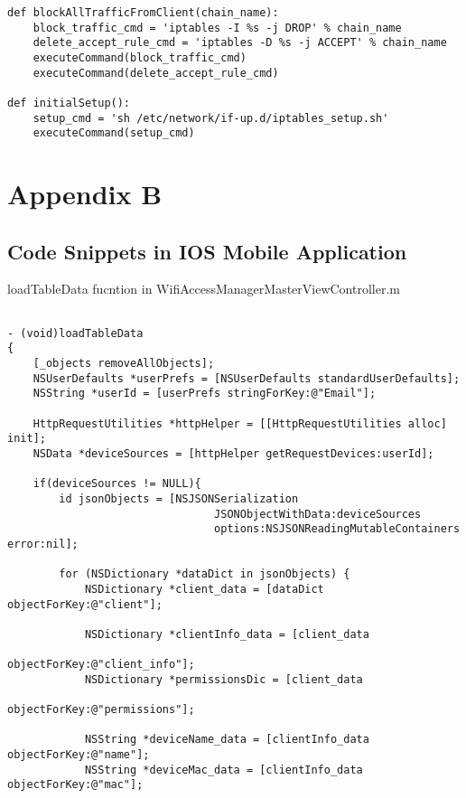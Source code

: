 \begin{appendices}
\begin{algorithm}[h]
\begin{verbatim}
def blockAllTrafficFromClient(chain_name):
    block_traffic_cmd = 'iptables -I %s -j DROP' % chain_name
    delete_accept_rule_cmd = 'iptables -D %s -j ACCEPT' % chain_name
    executeCommand(block_traffic_cmd)
    executeCommand(delete_accept_rule_cmd)

def initialSetup():
    setup_cmd = 'sh /etc/network/if-up.d/iptables_setup.sh'
    executeCommand(setup_cmd)

 \end{verbatim}
\end{algorithm}

\chapter{Appendix B}
\label{chp:appendix2}

\section{Code Snippets in IOS Mobile Application}

\begin{algorithm}[h]
  \caption{loadTableData fucntion in WifiAccessManagerMasterViewController.m}
  \label{code:ios_loadtabledata}
  \begin{verbatim}
  
- (void)loadTableData
{  
    [_objects removeAllObjects];
    NSUserDefaults *userPrefs = [NSUserDefaults standardUserDefaults];
    NSString *userId = [userPrefs stringForKey:@"Email"];
    
    HttpRequestUtilities *httpHelper = [[HttpRequestUtilities alloc] init];
    NSData *deviceSources = [httpHelper getRequestDevices:userId];
    
    if(deviceSources != NULL){
        id jsonObjects = [NSJSONSerialization 
        						JSONObjectWithData:deviceSources 
        						options:NSJSONReadingMutableContainers error:nil];
        
        for (NSDictionary *dataDict in jsonObjects) {
            NSDictionary *client_data = [dataDict objectForKey:@"client"];
            
            NSDictionary *clientInfo_data = [client_data 
            								objectForKey:@"client_info"];
            NSDictionary *permissionsDic = [client_data 
            								objectForKey:@"permissions"];
            
            NSString *deviceName_data = [clientInfo_data objectForKey:@"name"];
            NSString *deviceMac_data = [clientInfo_data objectForKey:@"mac"];
            

\end{verbatim}
\end{algorithm}
\end{appendices}
